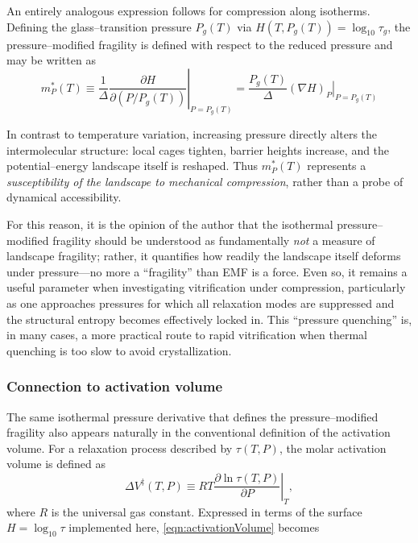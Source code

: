 An entirely analogous expression follows for compression along isotherms. Defining the glass--transition pressure $P_{g}(T)$ via $H\!\left(T,P_{g}(T)\right)=\log_{10}\tau_{g}$, the pressure--modified fragility is defined with respect to the reduced pressure and may be written as
\begin{equation}
	m^{*}_{P}(T)
	\equiv
	\left.
	\frac{1}{\Delta}
	\frac{\partial H}{\partial (P/P_{g}(T))}
	\right|_{P=P_{g}(T)}
	=
	\frac{P_{g}(T)}{\Delta}
	\left.
	(\nabla H)_P
	\right|_{P=P_{g}(T)}
\end{equation}


In contrast to temperature variation, increasing pressure directly alters the intermolecular structure: local cages tighten, barrier heights increase, and the potential–energy landscape itself is reshaped. Thus $m^{*}_{P}(T)$ represents a \emph{susceptibility of the landscape to mechanical compression}, rather than a probe of dynamical accessibility.

For this reason, it is the opinion of the author that the isothermal pressure--modified fragility should be understood as fundamentally \emph{not} a measure of landscape fragility; rather, it quantifies how readily the landscape itself deforms under pressure—no more a ``fragility'' than EMF is a force. Even so, it remains a useful parameter when investigating vitrification under compression, particularly as one approaches pressures for which all relaxation modes are suppressed and the structural entropy becomes effectively locked in. This ``pressure quenching'' is, in many cases, a more practical route to rapid vitrification when thermal quenching is too slow to avoid crystallization.

\subsubsection*{Connection to activation volume}

The same isothermal pressure derivative that defines the pressure--modified fragility also
appears naturally in the conventional definition of the activation volume.
For a relaxation process described by
$\tau(T,P)$, the molar activation volume is defined as
\begin{equation}
	\label{eqn:activationVolume}
	\Delta V^{\ddagger}(T,P)
	\equiv
	RT
	\left.
	\frac{\partial \ln \tau(T,P)}{\partial P}
	\right|_{T},
\end{equation}
where $R$ is the universal gas constant.
Expressed in terms of the surface 
$H=\log_{10}\tau$ implemented here, \eqn\ref{eqn:activationVolume} becomes

